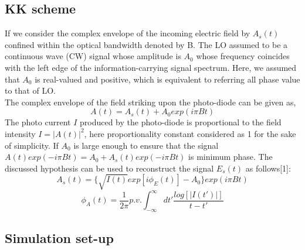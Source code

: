 \subsection{KK scheme}
If we consider the complex envelope of the incoming electric field by $A_s(t)$ confined within the optical bandwidth denoted by B. The LO assumed to be a continuous wave (CW) signal whose amplitude is $A_0$ whose frequency coincides with the left edge of the information-carrying signal spectrum. Here, we assumed that $A_0$ is real-valued and positive, which is equivalent to referring all phase value to that of LO.\\
The complex envelope of the field striking upon the photo-diode can be given as,
\begin{equation}
A(t)=A_s(t)+A_0 exp(i\pi Bt)
\end{equation}
The photo current $I$ produced by the photo-diode is proportional to the field intensity $I=|A(t)|^2$, here proportionality constant considered as 1 for the sake of simplicity. If $A_0$ is large enough to ensure that the signal $A(t)exp(-i\pi Bt)=A_0+A_s(t)exp(-i\pi Bt)$ is minimum phase. The discussed hypothesis can be used to reconstruct the signal $E_s(t)$ as follows[1]:
\begin{equation}
A_s(t)=\{\sqrt{I(t)} exp[i\phi_E(t)]-A_0\} exp(i\pi Bt)
\end{equation}
\begin{equation}
\phi_A(t)=\dfrac{1}{2\pi} p.v. \int_{-\infty}^{\infty} dt' \frac{log[|I(t')|]}{t-t'}
\label{Eq:5.19}
\end{equation}






\subsection{Simulation set-up}
